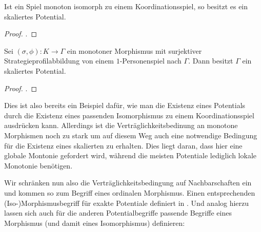 \begin{prop}
	Ist ein Spiel monoton isomorph zu einem Koordinationsspiel, so besitzt es ein skaliertes Potential.
\end{prop}

\begin{proof}.
	
\end{proof}

\begin{kor}
	Sei $(\sigma, \phi): K \to \Gamma$ ein monotoner Morphismus mit surjektiver Strategieprofilabbildung von einem $1$-Personenspiel nach $\Gamma$. Dann besitzt $\Gamma$ ein skaliertes Potential.
\end{kor}

\begin{proof}.
	
\end{proof}

Dies ist also bereits ein Beispiel dafür, wie man die Existenz eines Potentials durch die Existenz eines passenden Isomorphismus zu einem Koordinationsspiel ausdrücken kann. Allerdings ist die Verträglichkeitsbedinung an monotone Morphismen noch zu stark um auf diesem Weg auch eine notwendige Bedingung für die Existenz eines skalierten zu erhalten. Dies liegt daran, dass hier eine globale Montonie gefordert wird, während die meisten Potentiale lediglich lokale Monotonie benötigen.

Wir schränken nun also die Verträglichkeitsbedingung auf Nachbarschaften ein und kommen so zum Begriff eines ordinalen Morphismus. Einen entsprechenden (Iso-)Morphismusbegriff für exakte Potentiale definiert \citeauthor{ReprOfFiniteGamesAsNCG} in \cite{ReprOfFiniteGamesAsNCG}. Und analog hierzu lassen sich auch für die anderen Potentialbegriffe passende Begriffe eines Morphismus (und damit eines Isomorphismus) definieren:

